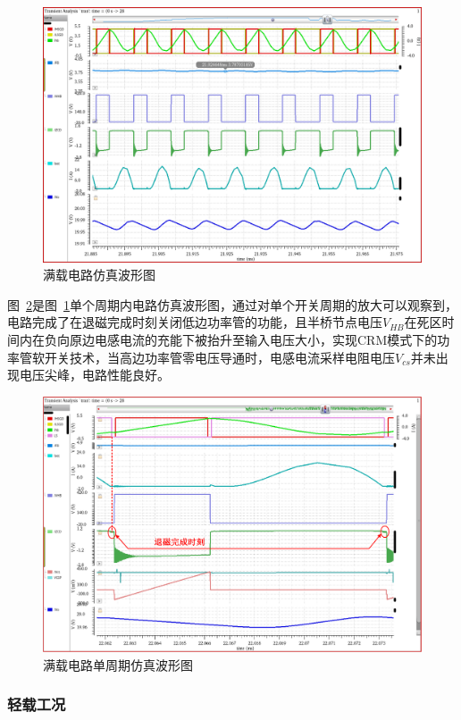 \begin{figure}[htbp] 
    \centering
    \includegraphics[width=0.8\linewidth]{figures/5A1_polt.png}
    \caption{满载电路仿真波形图}
    \label{fig:重载工况仿真波形图}
\end{figure} 

图~\ref{fig:重载工况单周期仿真波形图}是图~\ref{fig:重载工况仿真波形图}单个周期内电路仿真波形图，通过对单个开关周期的放大可以观察到，电路完成了在退磁完成时刻关闭低边功率管的功能，且半桥节点电压$V_{HB}$在死区时间内在负向原边电感电流的充能下被抬升至输入电压大小，实现CRM模式下的功率管软开关技术，当高边功率管零电压导通时，电感电流采样电阻电压$V_{cs}$并未出现电压尖峰，电路性能良好。

\begin{figure}[htbp] 
    \centering
    \includegraphics[width=0.8\linewidth]{figures/满载仿真图2.pdf}
    \caption{满载电路单周期仿真波形图}
    \label{fig:重载工况单周期仿真波形图}
\end{figure} 

\subsubsection{轻载工况}

